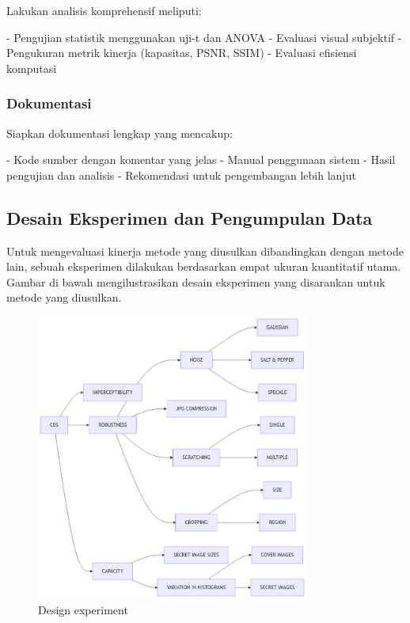 \documentclass{ittelkom}
\begin{document}
Lakukan analisis komprehensif meliputi:

- Pengujian statistik menggunakan uji-t dan ANOVA
- Evaluasi visual subjektif
- Pengukuran metrik kinerja (kapasitas, PSNR, SSIM)
- Evaluasi efisiensi komputasi

\subsubsection{Dokumentasi}

Siapkan dokumentasi lengkap yang mencakup:

- Kode sumber dengan komentar yang jelas
- Manual penggunaan sistem
- Hasil pengujian dan analisis
- Rekomendasi untuk pengembangan lebih lanjut

\subsection{Desain Eksperimen dan Pengumpulan Data}

Untuk mengevaluasi kinerja metode yang diusulkan dibandingkan dengan metode
lain, sebuah eksperimen dilakukan berdasarkan empat ukuran kuantitatif utama.
Gambar di bawah mengilustrasikan desain eksperimen yang disarankan untuk metode
yang diusulkan.

\begin{figure}[h]
    \centering
    \includegraphics[width=0.8\textwidth]{gambar/experiment.png}
    \caption{Design experiment}
    \label{fig:experiment}
\end{figure}
\end{document}
